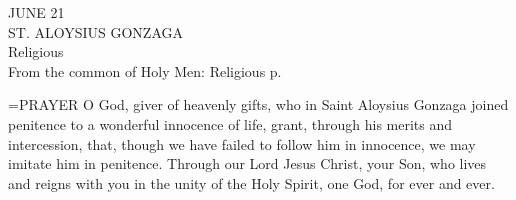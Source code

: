 \begin{center}\normalsize JUNE 21\\
\footnotesize ST. ALOYSIUS GONZAGA\\
\footnotesize Religious\\
\footnotesize From the common of Holy Men: Religious p. \\
\end{center}

\hangindent=\parindent \small{PRAYER 
O God, giver of heavenly gifts,
who in Saint Aloysius Gonzaga
joined penitence to a wonderful innocence of life,
grant, through his merits and intercession,
that, though we have failed to follow him in innocence,
we may imitate him in penitence.
Through our Lord Jesus Christ, your Son,
who lives and reigns with you in the unity of the Holy Spirit,
one God, for ever and ever.\\}
 
